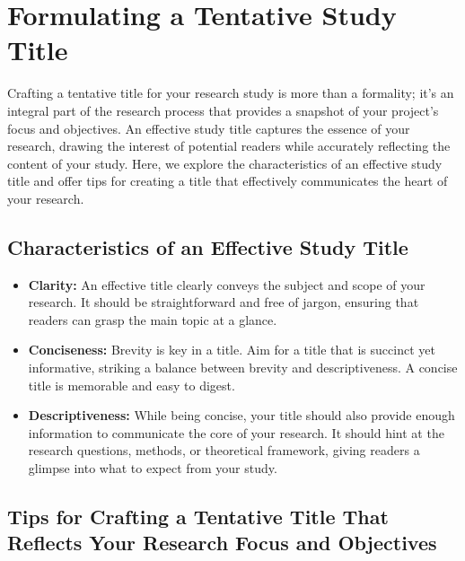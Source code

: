 \documentclass[
]{book}
\begin{document}
\hypertarget{formulating-a-tentative-study-title}{%
\section{Formulating a Tentative Study Title}\label{formulating-a-tentative-study-title}}

Crafting a tentative title for your research study is more than a formality; it's an integral part of the research process that provides a snapshot of your project's focus and objectives. An effective study title captures the essence of your research, drawing the interest of potential readers while accurately reflecting the content of your study. Here, we explore the characteristics of an effective study title and offer tips for creating a title that effectively communicates the heart of your research.

\hypertarget{characteristics-of-an-effective-study-title}{%
\subsection*{Characteristics of an Effective Study Title}\label{characteristics-of-an-effective-study-title}}

\begin{itemize}
\item
  \textbf{Clarity:} An effective title clearly conveys the subject and scope of your research. It should be straightforward and free of jargon, ensuring that readers can grasp the main topic at a glance.
\item
  \textbf{Conciseness:} Brevity is key in a title. Aim for a title that is succinct yet informative, striking a balance between brevity and descriptiveness. A concise title is memorable and easy to digest.
\item
  \textbf{Descriptiveness:} While being concise, your title should also provide enough information to communicate the core of your research. It should hint at the research questions, methods, or theoretical framework, giving readers a glimpse into what to expect from your study.
\end{itemize}

\hypertarget{tips-for-crafting-a-tentative-title-that-reflects-your-research-focus-and-objectives}{%
\subsection*{Tips for Crafting a Tentative Title That Reflects Your Research Focus and Objectives}\label{tips-for-crafting-a-tentative-title-that-reflects-your-research-focus-and-objectives}}
\end{document}
